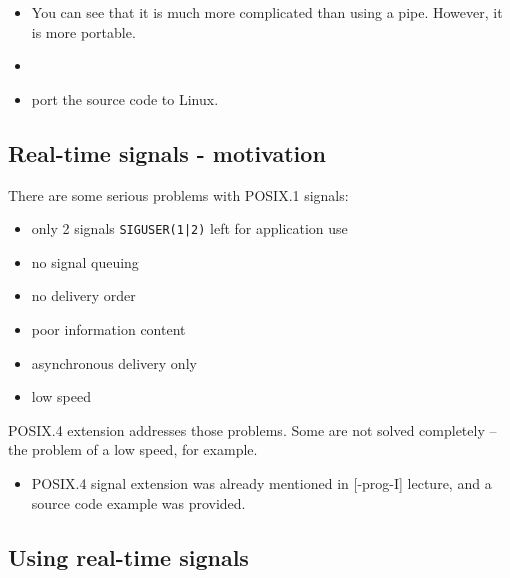 \begin{itemize}
\item You can see that it is much more complicated than using a pipe. However,
it is more portable.
\item {}
\item {} port the source code to Linux.
\end{itemize}

\subsection{Real-time signals - motivation}

There are some serious problems with POSIX.1 signals:

\begin{itemize}
\item only 2 signals \texttt{SIGUSER(1|2)} left for application use
\item no signal queuing
\item no delivery order
\item poor information content
\item asynchronous delivery only
\item low speed
\end{itemize}

POSIX.4 extension addresses those problems. Some are not solved completely --
the problem of a low speed, for example.


\begin{itemize}
\item POSIX.4 signal extension was already mentioned in [\myun\myix-prog-I]
lecture, and a source code example was provided.
\end{itemize}

\subsection{Using real-time signals}

